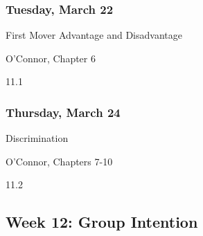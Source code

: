 \documentclass[
]{article}
\providecommand{\tightlist}{%
  \setlength{\itemsep}{0pt}\setlength{\parskip}{0pt}}
\begin{document}
\begin{multicols}{2}

\hypertarget{tuesday-march-22}{%
\subsubsection{Tuesday, March 22}\label{tuesday-march-22}}

\begin{description}
\tightlist
\item[Topic]
First Mover Advantage and Disadvantage
\item[Reading]
O'Connor, Chapter 6
\item[Video lectures]
11.1
\end{description}

\hypertarget{thursday-march-24}{%
\subsubsection{Thursday, March 24}\label{thursday-march-24}}

\begin{description}
\tightlist
\item[Topic]
Discrimination
\item[Reading]
O'Connor, Chapters 7-10
\item[Video lectures]
11.2
\end{description}

\end{multicols}

\newpage

\hypertarget{week-12-group-intention}{%
\subsection{Week 12: Group Intention}\label{week-12-group-intention}}
\end{document}
